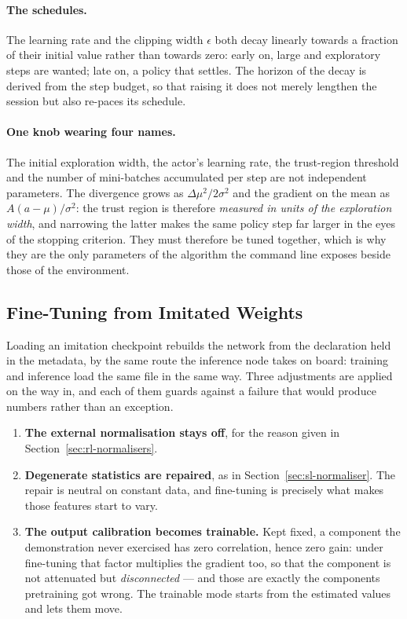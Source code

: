 \paragraph{The schedules.}
The learning rate and the clipping width $\epsilon$ both decay linearly towards
a fraction of their initial value rather than towards zero: early on, large and
exploratory steps are wanted; late on, a policy that settles. The horizon of the
decay is derived from the step budget, so that raising it does not merely
lengthen the session but also re-paces its schedule.

\paragraph{One knob wearing four names.}
The initial exploration width, the actor's learning rate, the trust-region
threshold and the number of mini-batches accumulated per step are not
independent parameters. The divergence grows as $\Delta\mu^2/2\sigma^2$ and the
gradient on the mean as $A(a-\mu)/\sigma^2$: the trust region is therefore
\emph{measured in units of the exploration width}, and narrowing the latter
makes the same policy step far larger in the eyes of the stopping criterion.
They must therefore be tuned together, which is why they are the only parameters
of the algorithm the command line exposes beside those of the environment.

\subsection{Fine-Tuning from Imitated Weights}
\label{sec:rl-finetuning}

Loading an imitation checkpoint rebuilds the network from the declaration held
in the metadata, by the same route the inference node takes on board: training
and inference load the same file in the same way. Three adjustments are applied
on the way in, and each of them guards against a failure that would produce
numbers rather than an exception.

\begin{enumerate}
  \item \textbf{The external normalisation stays off}, for the reason given in
        Section~\ref{sec:rl-normalisers}.
  \item \textbf{Degenerate statistics are repaired}, as in
        Section~\ref{sec:sl-normaliser}. The repair is neutral on constant data,
        and fine-tuning is precisely what makes those features start to vary.
  \item \textbf{The output calibration becomes trainable.} Kept fixed, a
        component the demonstration never exercised has zero correlation, hence
        zero gain: under fine-tuning that factor multiplies the gradient too, so
        that the component is not attenuated but \emph{disconnected} --- and
        those are exactly the components pretraining got wrong. The trainable
        mode starts from the estimated values and lets them move.
\end{enumerate}

